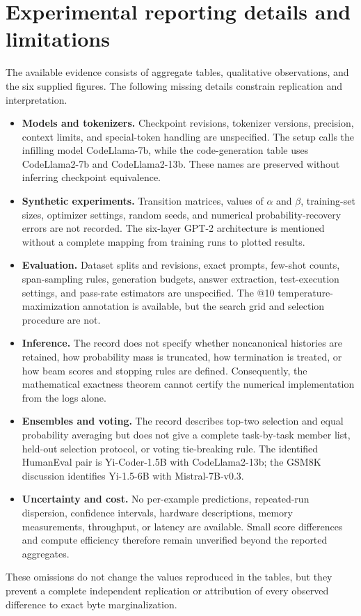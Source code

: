 \documentclass{article}
\begin{document}
\section{Experimental reporting details and limitations}
\label{app:reporting}
The available evidence consists of aggregate tables, qualitative observations, and the six supplied figures. The following missing details constrain replication and interpretation.
\begin{itemize}
 \item \textbf{Models and tokenizers.} Checkpoint revisions, tokenizer versions, precision, context limits, and special-token handling are unspecified. The setup calls the infilling model CodeLlama-7b, while the code-generation table uses CodeLlama2-7b and CodeLlama2-13b. These names are preserved without inferring checkpoint equivalence.
 \item \textbf{Synthetic experiments.} Transition matrices, values of $\alpha$ and $\beta$, training-set sizes, optimizer settings, random seeds, and numerical probability-recovery errors are not recorded. The six-layer GPT-2 architecture is mentioned without a complete mapping from training runs to plotted results.
 \item \textbf{Evaluation.} Dataset splits and revisions, exact prompts, few-shot counts, span-sampling rules, generation budgets, answer extraction, test-execution settings, and pass-rate estimators are unspecified. The @10 temperature-maximization annotation is available, but the search grid and selection procedure are not.
 \item \textbf{Inference.} The record does not specify whether noncanonical histories are retained, how probability mass is truncated, how termination is treated, or how beam scores and stopping rules are defined. Consequently, the mathematical exactness theorem cannot certify the numerical implementation from the logs alone.
 \item \textbf{Ensembles and voting.} The record describes top-two selection and equal probability averaging but does not give a complete task-by-task member list, held-out selection protocol, or voting tie-breaking rule. The identified HumanEval pair is Yi-Coder-1.5B with CodeLlama2-13b; the GSM8K discussion identifies Yi-1.5-6B with Mistral-7B-v0.3.
 \item \textbf{Uncertainty and cost.} No per-example predictions, repeated-run dispersion, confidence intervals, hardware descriptions, memory measurements, throughput, or latency are available. Small score differences and compute efficiency therefore remain unverified beyond the reported aggregates.
\end{itemize}
These omissions do not change the values reproduced in the tables, but they prevent a complete independent replication or attribution of every observed difference to exact byte marginalization.
\end{document}
